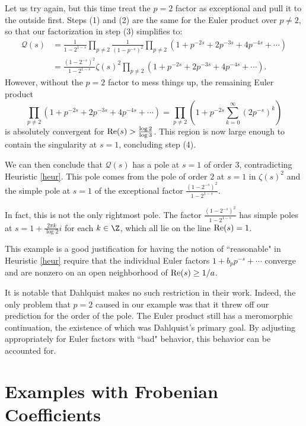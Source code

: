 \documentclass[12pt]{amsart}
\newenvironment{BOXexample}{
\begin{exbox}\mbox{}
\begin{example}
}
{
\end{example}
\end{exbox}
}
\theoremstyle{plain}
\begin{document}
\begin{BOXexample}
    Let us try again, but this time treat the $p=2$ factor as exceptional and pull it to the outside first. Steps (1) and (2) are the same for the Euler product over $p\ne 2$, so that our factorization in step (3) simplifies to:
    \begin{align*}
        \mathcal{Q}(s) &= \frac{1}{1-2^{1-s}}\prod_{p\ne 2}\frac{1}{(1-p^{-s})^2} \prod_{p\ne 2} (1 + p^{-2s} + 2p^{-3s} + 4p^{-4s}+\cdots)\\
        &= \frac{(1-2^{-s})^2}{1-2^{1-s}}\zeta(s)^2 \prod_{p\ne 2} (1 + p^{-2s} + 2p^{-3s} + 4p^{-4s}+\cdots).
    \end{align*}
    However, without the $p=2$ factor to mess things up, the remaining Euler product
    \[
    \prod_{p\ne 2} (1 + p^{-2s} + 2p^{-3s} + 4p^{-4s}+\cdots) = \prod_{p\ne 2}\left(1 + p^{-2s}\sum_{k=0}^\infty (2p^{-s})^k\right)
    \]
    is absolutely convergent for ${\rm Re}(s) > \frac{\log 2}{\log 3}$. This region is now large enough to contain the singularity at $s=1$, concluding step (4).

    We can then conclude that $\mathcal{Q}(s)$ has a pole at $s=1$ of order $3$, contradicting Heuristic \ref{heur}. This pole comes from the pole of order $2$ at $s=1$ in $\zeta(s)^2$ and the simple pole at $s=1$ of the exceptional factor $\frac{(1-2^{-s})^2}{1-2^{1-s}}$.

    In fact, this is not the only rightmost pole. The factor $\frac{(1-2^{-s})^2}{1-2^{1-s}}$ has simple poles at $s = 1 + \frac{2\pi k}{\log 2} i$ for each $k\in \Z$, which all lie on the line ${\rm Re}(s) = 1$.
\end{BOXexample}

This example is a good justification for having the notion of ``reasonable" in Heuristic \ref{heur} require that the individual Euler factors $1+b_p p^{-s} + \cdots$ converge and are nonzero on an open neighborhood of ${\rm Re}(s) \ge 1/a$.

It is notable that Dahlquist \cite{dahlquist_1952} makes no such restriction in their work. Indeed, the only problem that $p=2$ caused in our example was that it threw off our prediction for the order of the pole. The Euler product still has a meromorphic continuation, the existence of which was Dahlquist's primary goal. By adjusting appropriately for Euler factors with ``bad" behavior, this behavior can be accounted for.







\section{Examples with Frobenian Coefficients}\label{sec:examples_with_Frob_coef}
\end{document}
